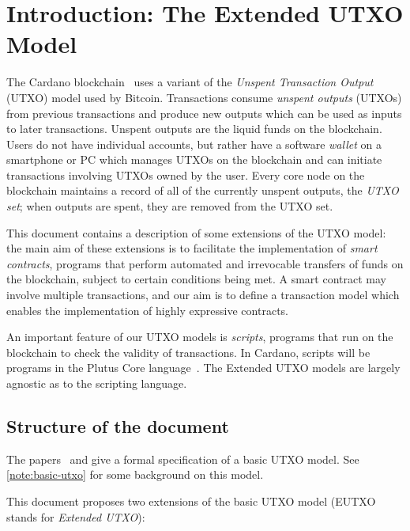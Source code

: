 \documentclass[a4paper]{article}
\newcounter{note}
\begin{document}
\maketitle

\section{Introduction: The Extended UTXO Model}
\label{sec:intro}
The Cardano blockchain~\citep{Cardano, Cardano-ledger-spec} uses a
variant of the \textit{Unspent Transaction Output} (UTXO) model used
by Bitcoin.  Transactions consume \textit{unspent outputs} (UTXOs)
from previous transactions and produce new outputs which can be used
as inputs to later transactions.  Unspent outputs are the liquid funds
on the blockchain. Users do not have individual accounts, but rather
have a software \textit{wallet} on a smartphone or PC which manages
UTXOs on the blockchain and can initiate transactions involving UTXOs
owned by the user.  Every core node on the blockchain maintains a
record of all of the currently unspent outputs, the \textit{UTXO set};
when outputs are spent, they are removed from the UTXO set.

This document contains a description of some extensions of the
UTXO model: the main aim of these extensions is to facilitate the
implementation of \textit{smart contracts}, programs that perform
automated and irrevocable transfers of funds on the blockchain, subject
to certain conditions being met.  A smart contract may involve
multiple transactions, and our aim is to define a transaction model
which enables the implementation of highly expressive contracts.

An important feature of our UTXO models is \textit{scripts},
programs that run on the blockchain to check the validity of
transactions.  In Cardano, scripts will be programs in the Plutus Core
language~\citep{Plutus-Core-spec}. The Extended UTXO models are largely
agnostic as to the scripting language.


\subsection{Structure of the document}
\label{sec:doc-structure}
The papers~\citep{Zahnentferner18-Chimeric} and
\citep{Zahnentferner18-UTxO} give a formal specification of a basic
UTXO model. See \cref{note:basic-utxo} for some background on
this model.

\medskip
\noindent This document proposes two extensions of the basic UTXO
model (EUTXO stands for \textit{Extended UTXO}):
\end{document}
